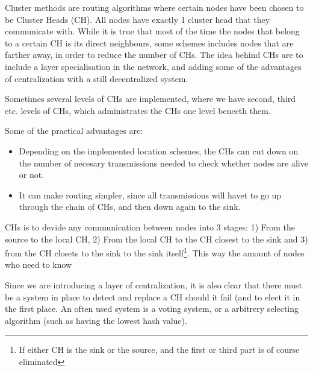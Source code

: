 \documentclass[letter, 12pt, english, draft]{article}
\begin{document}
Cluster methods are routing algorithms where certain nodes have been chosen to be Cluster Heads (CH). All nodes have exactly 1 cluster head that they communicate with. While it is true that most of the time the nodes that belong to a certain CH is its direct neighbours, some schemes includes nodes that are farther away, in order to reduce the number of CHs. The idea behind CHs are to include a layer specialisation in the network, and adding some of the advantages of centralization with a still decentralized system. 

Sometimes several levels of CHs are implemented, where we have second, third etc. levels of CHs, which administrates the CHs one level beneeth them.  

Some of the practical advantages are:
\begin{itemize}
\item Depending on the implemented location schemes, the CHs can cut down on the number of necesary transmissions needed to check whether nodes are alive or not.
\item It can make routing simpler, since all transmissions will havet to go up through the chain of CHs, and then down again to the sink. 
\end{itemize}

 CHs is to devide any communication between nodes into 3 stages: 1) From the source to the local CH, 2) From the local CH to the CH closest to the sink and 3) from the CH closets to the sink to the sink itself\footnote{If either CH is the sink or the source, and the first or third part is of course eliminated}. This way the amount of nodes who need to know  

Since we are introducing a layer of centralization, it is also clear that there must be a system in place to detect and replace a CH should it fail (and to elect it in the first place. An often used system is a voting system, or a arbitrery selecting algorithm (such as having the lowest hash value).


{}
\end{document}
